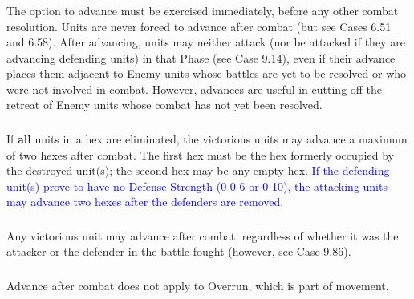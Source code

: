 \subsubsection{} The option to advance must be exercised immediately, before any other combat resolution. Units are never forced to advance after combat (but see Cases 6.51 and 6.58). After advancing, units may neither attack (nor be attacked if they are advancing defending units) in that Phase (see Case 9.14), even if their advance places them adjacent to Enemy units whose battles are yet to be resolved or who were not involved in combat. However, advances are useful in cutting off the retreat of Enemy units whose combat has not yet been resolved.

\subsubsection{} If \textbf{all} units in a hex are eliminated, the victorious units may advance a maximum of two hexes after combat. The first hex must be the hex formerly occupied by the destroyed unit(s); the second hex may be any empty hex. \textcolor{blue}{If the defending unit(s) prove to have no Defense Strength (0-0-6 or 0-10), the attacking units may advance two hexes after the defenders are removed.}

\subsubsection{} Any victorious unit may advance after combat, regardless of whether it was the attacker or the defender in the battle fought (however, see Case 9.86).

\subsubsection{} Advance after combat does not apply to Overrun, which is part of movement.

